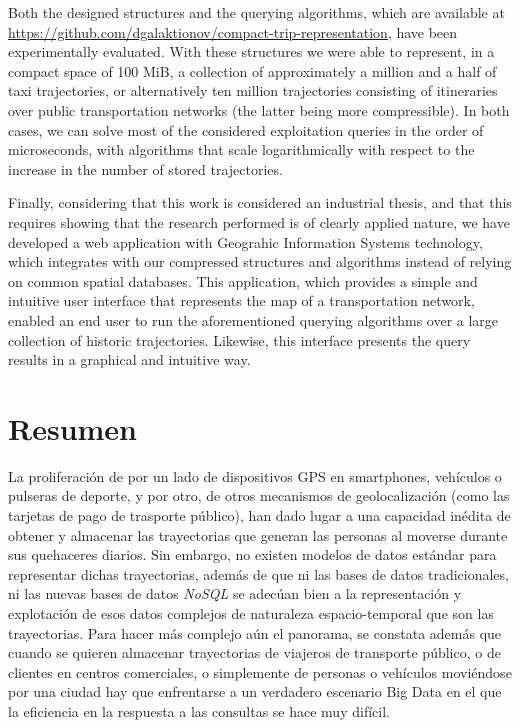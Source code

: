 Both the designed structures and the querying algorithms, which are available at \url{https://github.com/dgalaktionov/compact-trip-representation}, have been experimentally evaluated. With these structures we were able to represent, in a compact space of 100 MiB, a collection of approximately a million and a half of taxi trajectories, or alternatively ten million trajectories consisting of itineraries over public transportation networks (the latter being more compressible). In both cases, we can solve most of the considered exploitation queries in the order of microseconds, with algorithms that scale logarithmically with respect to the increase in the number of stored trajectories.

Finally, considering that this work is considered an industrial thesis, and that this requires showing that the research performed is of clearly applied nature, we have developed a web application with Geograhic Information Systems technology, which integrates with our compressed structures and algorithms instead of relying on common spatial databases. This application, which provides a simple and intuitive user interface that represents the map of a transportation network, enabled an end user to run the aforementioned querying algorithms over a large collection of historic trajectories. Likewise, this interface presents the query results in a graphical and intuitive way.

\chapter*{Resumen}

La proliferaci\'on de por un lado de dispositivos GPS en smartphones, veh\'iculos o pulseras de deporte,  y por otro, de otros mecanismos de geolocalizaci\'on (como las tarjetas de pago de trasporte p\'ublico), han dado lugar a una capacidad in\'edita de obtener y almacenar las trayectorias que generan las personas al moverse durante sus quehaceres diarios. Sin embargo, no existen modelos de datos est\'andar para representar dichas trayectorias, adem\'as de que ni las bases de datos tradicionales, ni las nuevas bases de datos \textit{NoSQL} se adec\'uan bien a la representaci\'on y explotaci\'on de esos datos complejos de naturaleza espacio-temporal que son las trayectorias.  Para hacer m\'as complejo a\'un el panorama, se constata adem\'as que cuando se quieren almacenar trayectorias de viajeros de transporte p\'ublico, o de clientes en centros comerciales, o simplemente de personas o veh\'iculos movi\'endose por una ciudad hay que enfrentarse a un verdadero escenario Big Data en el que la eficiencia en la respuesta a las consultas se hace muy dif\'icil.

